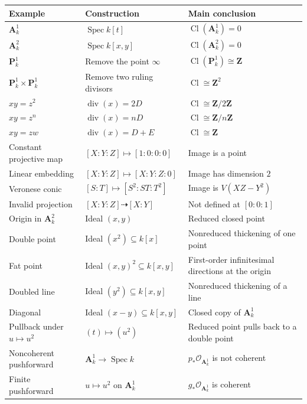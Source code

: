 \documentclass[12pt,a4paper]{article}
\theoremstyle{notespace}
\begin{document}
\renewcommand{\arraystretch}{1.35}
\begin{center}
	\begin{tabular}{|p{4.0cm}|p{5.2cm}|p{5.0cm}|}
		\hline
		\textbf{Example}
		&
		\textbf{Construction}
		&
		\textbf{Main conclusion}
		\\
		\hline
		\(\mathbf A^1_k\)
		&
		\(\operatorname{Spec}k[t]\)
		&
		\(\operatorname{Cl}(\mathbf A^1_k)=0\)
		\\
		\hline
		\(\mathbf A^2_k\)
		&
		\(\operatorname{Spec}k[x,y]\)
		&
		\(\operatorname{Cl}(\mathbf A^2_k)=0\)
		\\
		\hline
		\(\mathbf P^1_k\)
		&
		Remove the point \(\infty\)
		&
		\(\operatorname{Cl}(\mathbf P^1_k)\cong\mathbf Z\)
		\\
		\hline
		\(\mathbf P^1_k\times\mathbf P^1_k\)
		&
		Remove two ruling divisors
		&
		\(\operatorname{Cl}\cong\mathbf Z^2\)
		\\
		\hline
		\(xy=z^2\)
		&
		\(\operatorname{div}(x)=2D\)
		&
		\(\operatorname{Cl}\cong\mathbf Z/2\mathbf Z\)
		\\
		\hline
		\(xy=z^n\)
		&
		\(\operatorname{div}(x)=nD\)
		&
		\(\operatorname{Cl}\cong\mathbf Z/n\mathbf Z\)
		\\
		\hline
		\(xy=zw\)
		&
		\(\operatorname{div}(x)=D+E\)
		&
		\(\operatorname{Cl}\cong\mathbf Z\)
		\\
		\hline
		Constant projective map
		&
		\([X:Y:Z]\mapsto[1:0:0:0]\)
		&
		Image is a point
		\\
		\hline
		Linear embedding
		&
		\([X:Y:Z]\mapsto[X:Y:Z:0]\)
		&
		Image has dimension \(2\)
		\\
		\hline
		Veronese conic
		&
		\([S:T]\mapsto[S^2:ST:T^2]\)
		&
		Image is \(V(XZ-Y^2)\)
		\\
		\hline
		Invalid projection
		&
		\([X:Y:Z]\dashrightarrow[X:Y]\)
		&
		Not defined at \([0:0:1]\)
		\\
		\hline
		Origin in \(\mathbf A^2_k\)
		&
		Ideal \((x,y)\)
		&
		Reduced closed point
		\\
		\hline
		Double point
		&
		Ideal \((x^2)\subseteq k[x]\)
		&
		Nonreduced thickening of one point
		\\
		\hline
		Fat point
		&
		Ideal \((x,y)^2\subseteq k[x,y]\)
		&
		First-order infinitesimal directions at the origin
		\\
		\hline
		Doubled line
		&
		Ideal \((y^2)\subseteq k[x,y]\)
		&
		Nonreduced thickening of a line
		\\
		\hline
		Diagonal
		&
		Ideal \((x-y)\subseteq k[x,y]\)
		&
		Closed copy of \(\mathbf A^1_k\)
		\\
		\hline
		Pullback under \(u\mapsto u^2\)
		&
		\((t)\mapsto(u^2)\)
		&
		Reduced point pulls back to a double point
		\\
		\hline
		Noncoherent pushforward
		&
		\(\mathbf A^1_k\to\operatorname{Spec}k\)
		&
		\(p_*\mathcal O_{\mathbf A^1_k}\) is not coherent
		\\
		\hline
		Finite pushforward
		&
		\(u\mapsto u^2\) on \(\mathbf A^1_k\)
		&
		\(g_*\mathcal O_{\mathbf A^1_k}\) is coherent
		\\
		\hline
	\end{tabular}
\end{center}
\end{document}
